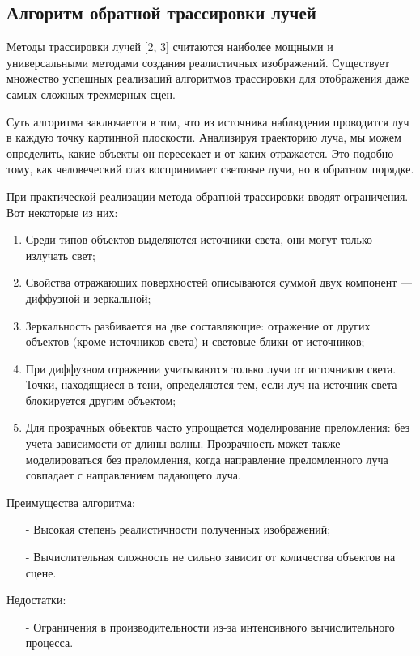 \subsection{Алгоритм обратной трассировки лучей}

Методы трассировки лучей [2, 3] считаются наиболее мощными и универсальными методами создания реалистичных изображений. Существует множество успешных реализаций алгоритмов трассировки для отображения даже самых сложных трехмерных сцен.

Суть алгоритма заключается в том, что из источника наблюдения проводится луч в каждую точку картинной плоскости. Анализируя траекторию луча, мы можем определить, какие объекты он пересекает и от каких отражается. Это подобно тому, как человеческий глаз воспринимает световые лучи, но в обратном порядке.

При практической реализации метода обратной трассировки вводят ограничения. Вот некоторые из них:
\begin{enumerate}[label=\arabic*)]
	\item Среди типов объектов выделяются источники света, они могут только излучать свет;
	\item Свойства отражающих поверхностей описываются суммой двух компонент — диффузной и зеркальной;
	\item Зеркальность разбивается на две составляющие: отражение от других объектов (кроме источников света) и световые блики от источников;
	\item При диффузном отражении учитываются только лучи от источников света. Точки, находящиеся в тени, определяются тем, если луч на источник света блокируется другим объектом;
	\item Для прозрачных объектов часто упрощается моделирование преломления: без учета зависимости от длины волны. Прозрачность может также моделироваться без преломления, когда направление преломленного луча совпадает с направлением падающего луча.
\end{enumerate}

Преимущества алгоритма:
\begin{itemize}[label=\arabic*)]
	\item[-] Высокая степень реалистичности полученных изображений;
	\item[-] Вычислительная сложность не сильно зависит от количества объектов на сцене.
\end{itemize}
Недостатки:
\begin{itemize}[label=\arabic*)]
	\item[-] Ограничения в производительности из-за интенсивного вычислительного процесса.
\end{itemize}

